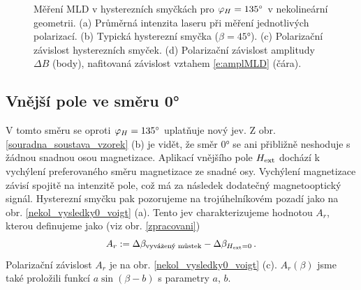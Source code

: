 \begin{figure}[htbp]\centering
{}
	\caption{Měření MLD v hysterezních smyčkách pro $\varphi_H=\ang{135}$ v nekolineární geometrii. (a) Průměrná intenzita laseru při měření jednotlivých polarizací. (b) Typická hysterezní smyčka ($\beta=\ang{45}$). (c) Polarizační závislost hysterezních smyček. (d) Polarizační závislost amplitudy $\Delta B$ (body), nafitovaná závislost vztahem \eqref{e:amplMLD} (čára).}\label{nekol_vysledky_mld}
\end{figure}


\FloatBarrier

\subsection*{Vnější pole ve směru \ang{0}}

V tomto směru se oproti $\varphi_H=\ang{135}$ uplatňuje nový jev. Z obr. \ref{souradna_soustava_vzorek} (b) je vidět, že směr \ang{0} se ani přibližně neshoduje s žádnou snadnou osou magnetizace. Aplikací vnějšího pole $H_\text{ext}$ dochází k vychýlení preferovaného směru magnetizace ze snadné osy. Vychýlení magnetizace závisí spojitě na intenzitě pole, což má za následek dodatečný magnetooptický signál. Hysterezní smyčku pak pozorujeme na trojúhelníkovém pozadí jako na obr. \ref{nekol_vysledky0_voigt} (a). Tento jev charakterizujeme hodnotou $A_r$, kterou definujeme jako (viz obr. \ref{zpracovani})
\begin{equation} \label{e:Ar}
A_{r}:=\Delta \beta_\text{vyvážený můstek} - \Delta \beta_{H_\text{ext}=0} \,.
\end{equation}
Polarizační závislost $A_r$ je na obr. \ref{nekol_vysledky0_voigt} (c).
$A_r (\beta)$ jsme také proložili funkcí $a\sin(\beta-b)$ s parametry $a$, $b$.

